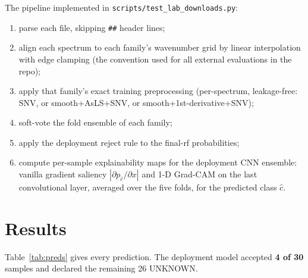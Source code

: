 \documentclass[11pt,a4paper]{article}
\begin{document}
The pipeline implemented in \texttt{scripts/test\_lab\_downloads.py}:

\begin{enumerate}
  \item parse each file, skipping \texttt{\#\#} header lines;
  \item align each spectrum to each family's wavenumber grid by linear
        interpolation with edge clamping (the convention used for all
        external evaluations in the repo);
  \item apply that family's exact training preprocessing
        (per-spectrum, leakage-free: SNV, or smooth+AsLS+SNV, or
        smooth+1st-derivative+SNV);
  \item soft-vote the fold ensemble of each family;
  \item apply the deployment reject rule to the final-rf probabilities;
  \item compute per-sample explainability maps for the deployment CNN
        ensemble: vanilla gradient saliency
        $|\partial p_{\hat c}/\partial x|$ and 1-D Grad-CAM on the last
        convolutional layer, averaged over the five folds, for the predicted
        class $\hat c$.
\end{enumerate}

\section{Results}
\label{sec:results}

Table~\ref{tab:preds} gives every prediction. The deployment model accepted
\textbf{4 of 30} samples and declared the remaining 26 UNKNOWN.
\end{document}
